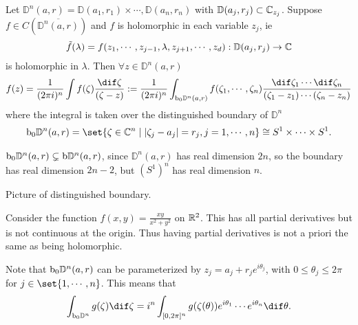 \begin{theorem}
    Let $\mathbb{D}^n(a,r) = \mathbb{D}(a_1,r_1) \times \cdots, \mathbb{D}(a_n ,r_n)$ with $\mathbb{D}(a_j,r_j) \subset \mathbb{C}_{z_j}$. Suppose $f \in C( \overline{\mathbb{D}^n (a,r)} )$ and $f$ is holomorphic in each variable $z_j$, ie
    \begin{align*}
        \tilde{f}(\lambda) = f(z_1 , \cdots, z_{j-1} , \lambda , z_{j+1} , \cdots, z_d) : \mathbb{D} (a_j , r_j) \to \mathbb{C}
    \end{align*}
    is holomorphic in $\lambda$. Then $\forall z \in \mathbb{D}^n (a,r)$
    \begin{align*}
        f(z) = \frac{1}{(2 \pi i)^n} \int f(\zeta) \frac{\dif \zeta}{(\zeta - z)} := \frac{1}{(2 \pi i)^n} \int_{\bdy_0 \mathbb{D}^n (a,r)} f(\zeta_1 , \cdots, \zeta_n) \frac{\dif \zeta_1 \cdots \dif \zeta_n}{(\zeta_1 - z_1 ) \cdots (\zeta_n - z_n)} 
    \end{align*}
    where the integral is taken over the distinguished boundary of $\mathbb{D}^n$
    \begin{align*}
        \bdy_0 \mathbb{D}^n (a,r) = \set{\zeta \in \C^n \mid |\zeta_j - a_j| = r_j , j = 1 , \cdots, n} \cong S^1 \times \cdots \times S^1.
    \end{align*}
\end{theorem}

\begin{remark}
    $\operatorname{b}\!_0 \mathbb{D}^n(a,r) \subsetneq \operatorname{b}\! \mathbb{D}^n(a,r)$, since $\mathbb{D}^n(a,r)$ has real dimension $2n$, so the boundary has real dimension $2n-2$, but $(S^1)^n$ has real dimension $n$.

    Picture of distinguished boundary.
\end{remark}

\begin{remark}
    Consider the function $f(x,y) = \frac{xy}{x^2 +y^2}$ on $\mathbb{R}^2$. This has all partial derivatives but is not continuous at the origin. Thus having partial derivatives is not a priori the same as being holomorphic.
\end{remark}

\begin{remark}
    Note that $\operatorname{b}\!_0 \mathbb{D}^n(a,r)$ can be parameterized by $z_j = a_j + r_j e^{i \theta_j}$, with $0 \leq \theta_j \leq 2 \pi$ for $j \in \set{1, \cdots, n}$. This means that
    \begin{align*}
        \int_{\bdy_0 \mathbb{D}^n} g(\zeta) \dif \zeta =  i^n \int_{[0,2 \pi]^n} g(\zeta(\theta)) e^{i \theta_1} \cdots e^{i \theta_n} \dif \theta.
    \end{align*}
\end{remark}

